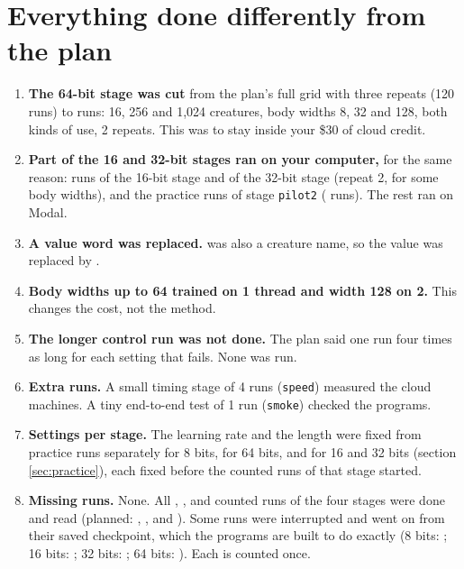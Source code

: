 \section{Everything done differently from the plan}\label{sec:extras}

\begin{enumerate}[itemsep=1.5pt]
\item \textbf{The 64-bit stage was cut} from the plan's full grid with three repeats (120 runs) to
   runs: 16, 256 and 1,024 creatures, body widths 8, 32 and 128, both kinds of
  use, 2 repeats. This was to stay inside your \$30 of cloud credit.
\item \textbf{Part of the 16 and 32-bit stages ran on your computer,} for the same reason:
   runs of the 16-bit stage and  of the 32-bit stage (repeat 2, for
  some body widths), and the practice runs of stage \texttt{pilot2}
  ( runs). The rest ran on Modal.
\item \textbf{A value word was replaced.}  was also a creature name, so the value
   was replaced by .
\item \textbf{Body widths up to 64 trained on 1 thread and width 128 on 2.} This changes the cost,
  not the method.
\item \textbf{The longer control run was not done.} The plan said one run four times as long for
  each setting that fails. None was run.
\item \textbf{Extra runs.} A small timing stage of 4 runs (\texttt{speed}) measured the cloud
  machines. A tiny end-to-end test of 1 run (\texttt{smoke}) checked the programs.
\item \textbf{Settings per stage.} The learning rate and the length were fixed from practice runs
  separately for 8 bits, for 64 bits, and for 16 and 32 bits (section \ref{sec:practice}), each
  fixed before the counted runs of that stage started.
\item \textbf{Missing runs.} None. All , ,  and
   counted runs of the four stages were done and read (planned: ,
  ,  and ). Some runs were interrupted and went on from their saved checkpoint, which the programs are built to do exactly (8 bits: ; 16 bits: ; 32 bits: ; 64 bits: ). Each is counted once.
\end{enumerate}


